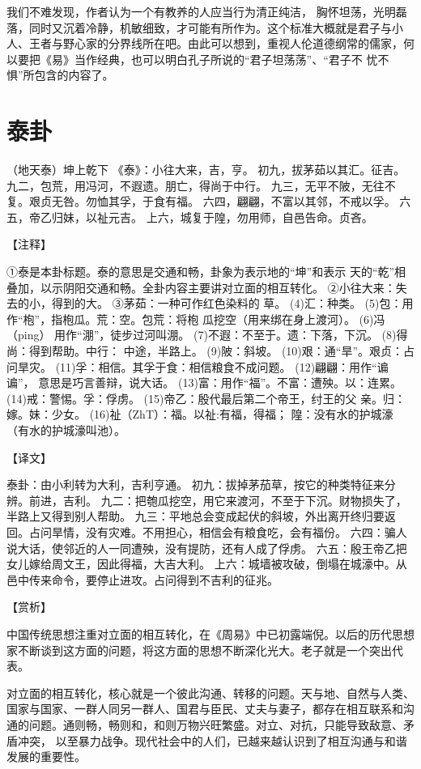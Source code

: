 \documentclass[a4paper,12pt,UTF8,twoside]{ctexbook}
\begin{document}
我们不难发现，作者认为一个有教养的人应当行为清正纯洁， 胸怀坦荡，光明磊落，同时又沉着冷静，机敏细致，才可能有所作为。这个标准大概就是君子与小人、王者与野心家的分界线所在吧。由此可以想到，重视人伦道德纲常的儒家，何以要把《易》当作经典，也可以明白孔子所说的“君子坦荡荡”、“君子不 忧不惧”所包含的内容了。

\chapter{泰卦}

（地天泰）坤上乾下
《泰》：小往大来，吉，亨。
初九，拔茅茹以其汇。征吉。
九二，包荒，用冯河，不遐遗。朋亡，得尚于中行。
九三，无平不陂，无往不复。艰贞无咎。勿恤其孚，于食有福。
六四，翩翩，不富以其邻，不戒以孚。
六五，帝乙归妹，以祉元吉。
上六，城复于隍，勿用师，自邑告命。贞吝。

【注释】

①泰是本卦标题。泰的意思是交通和畅，卦象为表示地的“坤”和表示 天的“乾”相叠加，以示阴阳交通和畅。全卦内容主要讲对立面的相互转化。
②小往大来：失去的小，得到的大。
③茅茹：一种可作红色染料的 草。
(4)汇：种类。
(5)包：用作“枹”，指枹瓜。荒：空。包荒：将枹 瓜挖空（用来绑在身上渡河）。
(6)冯（ping） 用作“淜”，徒步过河叫淜。
(7)不遐：不至于。遗：下落，下沉。
(8)得尚：得到帮助。中行： 中途，半路上。
(9)陂：斜坡。
(10)艰：通“旱”。艰贞：占问旱灾。
(11)孚：相信。其孚于食：相信粮食不成问题。
(12)翩翩：用作“谝谝”， 意思是巧言善辩，说大话。
(13)富：用作“福”。不富：遭殃。以：连累。
(14)戒：警惕。孚：俘虏。
(15)帝乙：殷代最后第二个帝王，纣王的父 亲。归：嫁。妹：少女。
(16)祉（ZhT）：福。以祉:有福，得福； 隍：没有水的护城濠（有水的护城濠叫池）。

【译文】

泰卦：由小利转为大利，吉利亨通。
初九：拔掉茅茄草，按它的种类特征来分辨。前进，吉利。
九二：把匏瓜挖空，用它来渡河，不至于下沉。财物损失了， 半路上又得到别人帮助。
九三：平地总会变成起伏的斜坡，外出离开终归要返回。占问旱情，没有灾难。不用担心，相信会有粮食吃，会有福份。
六四：骗人说大话，使邻近的人一同遭殃，没有提防，还有人成了俘虏。
六五：殷王帝乙把女儿嫁给周文王，因此得福，大吉大利。
上六：城墙被攻破，倒塌在城濠中。从邑中传来命令，要停止进攻。占问得到不吉利的征兆。

【赏析】

中国传统思想注重对立面的相互转化，在《周易》中已初露端倪。以后的历代思想家不断谈到这方面的问题，将这方面的思想不断深化光大。老子就是一个突出代表。

对立面的相互转化，核心就是一个彼此沟通、转移的问题。天与地、自然与人类、国家与国家、一群人同另一群人、国君与臣民、丈夫与妻子，都存在相互联系和沟通的问题。通则畅，畅则和，和则万物兴旺繁盛。对立、对抗，只能导致敌意、矛盾冲突， 以至暴力战争。现代社会中的人们，已越来越认识到了相互沟通与和谐发展的重要性。
\end{document}
